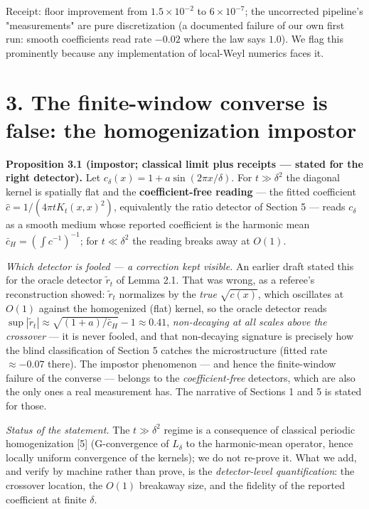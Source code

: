 \documentclass[11pt]{article}
\begin{document}
Receipt: floor improvement from $1.5\times 10^{-2}$ to $6\times 10^{-7}$; the uncorrected pipeline's "measurements" are pure discretization (a documented failure of our own first run: smooth coefficients read rate $-0.02$ where the law says $1.0$).  We flag this prominently because any implementation of local-Weyl numerics faces it.

\section*{3. The finite-window converse is false: the homogenization impostor}
\textbf{Proposition 3.1 (impostor; classical limit plus receipts — stated for the right detector).}  Let $c_\delta(x) = 1 + a\sin(2\pi x/\delta)$.  For $t \gg \delta^2$ the diagonal kernel is spatially flat and the \textbf{coefficient-free reading} — the fitted coefficient $\hat c = 1/(4\pi t K_t(x,x)^2)$, equivalently the ratio detector of Section 5 — reads $c_\delta$ as a smooth medium whose reported coefficient is the harmonic mean $\bar c_H = (\int c^{-1})^{-1}$; for $t \ll \delta^2$ the reading breaks away at $O(1)$.

\emph{Which detector is fooled — a correction kept visible.}  An earlier draft stated this for the oracle detector $\tilde r_t$ of Lemma 2.1. That was wrong, as a referee's reconstruction showed: $\tilde r_t$ normalizes by the \emph{true} $\sqrt{c(x)}$, which oscillates at $O(1)$ against the homogenized (flat) kernel, so the oracle detector reads $\sup|\tilde r_t| \approx \sqrt{(1+a)/\bar c_H} - 1 \approx 0.41$, \emph{non-decaying at all scales above the crossover} — it is never fooled, and that non-decaying signature is precisely how the blind classification of Section 5 catches the microstructure (fitted rate $\approx -0.07$ there).  The impostor phenomenon — and hence the finite-window failure of the converse — belongs to the \emph{coefficient-free} detectors, which are also the only ones a real measurement has.  The narrative of Sections 1 and 5 is stated for those.

\emph{Status of the statement.}  The $t \gg \delta^2$ regime is a consequence of classical periodic homogenization [5] (G-convergence of $L_\delta$ to the harmonic-mean operator, hence locally uniform convergence of the kernels); we do not re-prove it.  What we add, and verify by machine rather than prove, is the \emph{detector-level quantification}: the crossover location, the $O(1)$ breakaway size, and the fidelity of the reported coefficient at finite $\delta$.
\end{document}
